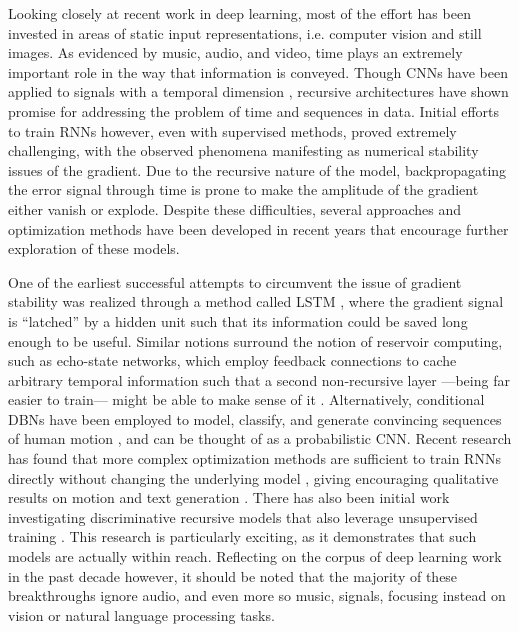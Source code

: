 Looking closely at recent work in deep learning, most of the effort has been invested in areas of static input representations, i.e. computer vision and still images.
As evidenced by music, audio, and video, time plays an extremely important role in the way that information is conveyed.
Though CNNs have been applied to signals with a temporal dimension \cite{LeCun1994}, recursive architectures have shown promise for addressing the problem of time and sequences in data.
Initial efforts to train RNNs however, even with supervised methods, proved extremely challenging, with the observed phenomena manifesting as numerical stability issues of the gradient.
Due to the recursive nature of the model, backpropagating the error signal through time is prone to make the amplitude of the gradient either vanish or explode.
Despite these difficulties, several approaches and optimization methods have been developed in recent years that encourage further exploration of these models.

One of the earliest successful attempts to circumvent the issue of gradient stability was realized through a method called LSTM \cite{Schmidhuber1997}, where the gradient signal is ``latched'' by a hidden unit such that its information could be saved long enough to be useful.
Similar notions surround the notion of reservoir computing, such as echo-state networks, which employ feedback connections to cache arbitrary temporal information such that a second non-recursive layer ---being far easier to train--- might be able to make sense of it \cite{Jaeger2002}.
Alternatively, conditional DBNs have been employed to model, classify, and generate convincing sequences of human motion \cite{JMLR2011}, and can be thought of as a probabilistic CNN.
Recent research has found that more complex optimization methods are sufficient to train RNNs directly without changing the underlying model \cite{Martens2010}, giving encouraging qualitative results on motion \cite{Sutskever2008} and text generation \cite{Sutskever2011}.
There has also been initial work investigating discriminative recursive models that also leverage unsupervised training \cite{Rolfe2013}.
This research is particularly exciting, as it demonstrates that such models are actually within reach.
Reflecting on the corpus of deep learning work in the past decade however, it should be noted that the majority of these breakthroughs ignore audio, and even more so music, signals, focusing instead on vision or natural language processing tasks.
